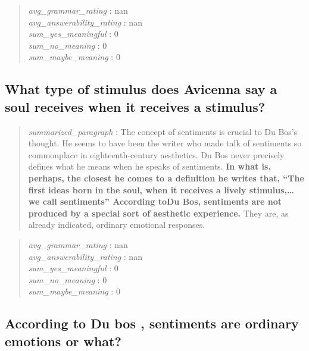\begin{quote}
\emph{avg\_grammar\_rating} : nan\\
\emph{avg\_answerability\_rating} : nan\\
\emph{sum\_yes\_meaningful} : 0\\
\emph{sum\_no\_meaning} : 0\\
\emph{sum\_maybe\_meaning} : 0
\end{quote}

\hypertarget{what-type-of-stimulus-does-avicenna-say-a-soul-receives-when-it-receives-a-stimulus}{%
\subsection{What type of stimulus does Avicenna say a soul receives when
it receives a
stimulus?}\label{what-type-of-stimulus-does-avicenna-say-a-soul-receives-when-it-receives-a-stimulus}}

\begin{quote}
\emph{summarized\_paragraph} : The concept of sentiments is crucial to
Du Bos's thought. He seems to have been the writer who made talk of
sentiments so commonplace in eighteenth-century aesthetics. Du Bos never
precisely defines what he means when he speaks of sentiments. \textbf{In
what is, perhaps, the closest he comes to a definition he writes that,
``The first ideas born in the soul, when it receives a lively
stimulus,\ldots we call sentiments'' According toDu Bos, sentiments are
not produced by a special sort of aesthetic experience.} They are, as
already indicated, ordinary emotional responses.
\end{quote}

\begin{quote}
\emph{avg\_grammar\_rating} : nan\\
\emph{avg\_answerability\_rating} : nan\\
\emph{sum\_yes\_meaningful} : 0\\
\emph{sum\_no\_meaning} : 0\\
\emph{sum\_maybe\_meaning} : 0
\end{quote}

\hypertarget{according-to-du-bos-sentiments-are-ordinary-emotions-or-what}{%
\subsection{According to Du bos , sentiments are ordinary emotions or
what?}\label{according-to-du-bos-sentiments-are-ordinary-emotions-or-what}}

